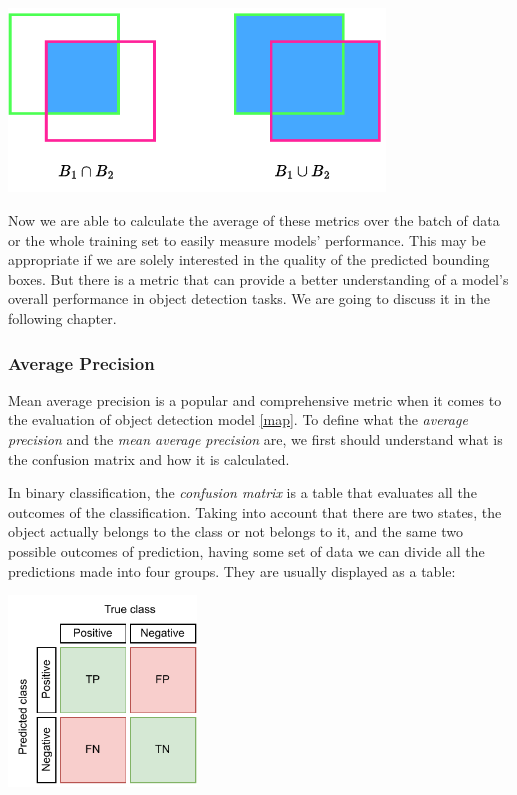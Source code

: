 \documentclass[14pt,a4paper]{extarticle}
\newcounter{e}
\newcounter{tabl}
\numberwithin{equation}{section}
\numberwithin{figure}{section}
\begin{document}
\begin{center}
    \includegraphics[width=10cm]{images/iou.pdf}
\end{center}

Now we are able to calculate the average of these metrics over the batch of data or the whole training set to easily measure models' performance. This may be  appropriate if we are solely interested in the quality of the predicted bounding boxes. But there is a metric that can provide a better understanding of a model's overall performance in object detection tasks. We are going to discuss it in the following chapter.

        
\subsubsection{Average Precision}
Mean average precision is a popular and comprehensive metric when it comes to the evaluation of object detection model \ref{map}.
To define what the \textit{average precision} and the \textit{mean average precision} are, we first should understand what is the confusion matrix and how it is calculated.

In binary classification, the \textit{confusion matrix} is a table that evaluates all the outcomes of the classification. Taking into account that there are two states, the object actually belongs to the class or not belongs to it, and the same two possible outcomes of prediction, having some set of data we can divide all the predictions made into four groups. They are usually displayed as a table:

\begin{center}
    \includegraphics[width=5cm]{images/confusion-matrix.pdf}
\end{center}
\end{document}
